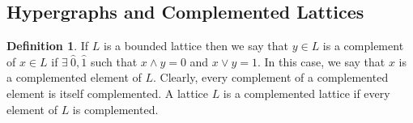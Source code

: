 \documentclass[11pt]{amsart}
\newcommand{\LC}{\mathcal{L}}
\theoremstyle{plain}
\numberwithin{lemma}{\DefaultNumberTheoremWithin}
\numberwithin{claim}{\DefaultNumberTheoremWithin}
\newtheorem{theorem}{Theorem}
\numberwithin{theorem}{\DefaultNumberTheoremWithin}
\numberwithin{corollary}{\DefaultNumberTheoremWithin}
\numberwithin{proposition}{\DefaultNumberTheoremWithin}
\numberwithin{conjecture}{\DefaultNumberTheoremWithin}
\theoremstyle{definition}
\newtheorem{definition}{Definition}
\numberwithin{definition}{\DefaultNumberTheoremWithin}
\theoremstyle{definition}
\numberwithin{question}{\DefaultNumberTheoremWithin}
\theoremstyle{definition}
\numberwithin{problem}{\DefaultNumberTheoremWithin}
\theoremstyle{remark}
\numberwithin{remark}
     {\DefaultNumberTheoremWithin}
\theoremstyle{remark}
\newtheorem{example}{Example}
\numberwithin{example}{\DefaultNumberTheoremWithin}
\begin{document}

\subsection{Hypergraphs and Complemented Lattices}
    

\begin{definition}
    If $L$ is a bounded lattice then we say that $y \in L$ is a complement of $x \in L$ if $\exists ~ \hat{0}, \hat{1} $ such that  $x \wedge y = 0$ and $x \vee y = 1.$ In this case, we say that $x$ is a complemented element of $L$. Clearly, every complement of a complemented element is itself complemented. A lattice $L$ is a complemented lattice if every element of $L$ is complemented.
\end{definition} 
 


 
\end{document}
